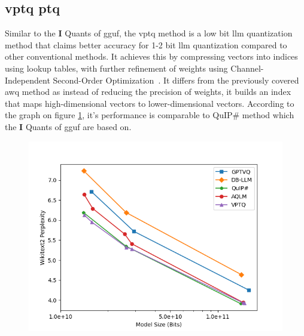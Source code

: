 \documentclass{ifacconf}
\begin{document}
	\subsection{\gls{vptq} \gls{ptq}}
	
	Similar to the \textbf{I} Quants of \gls{gguf}, the \gls{vptq} method is a low bit \gls{llm} quantization method that claims better accuracy for 1-2 bit \gls{llm} quantization compared to other conventional methods. It achieves this by compressing vectors into indices using lookup tables, with further refinement of weights using Channel-Independent Second-Order Optimization~\cite{liu2024vptqextremelowbitvector}. It differs from the previously covered \gls{awq} method as instead of reducing the precision of weights, it builds an index that maps high-dimensional vectors to lower-dimensional vectors. According to the graph on figure \ref{fig:vptq}, it's performance is comparable to QuIP\# method which the \textbf{I} Quants of \gls{gguf} are based on.
	
	\begin{figure}[h]
		\includegraphics[width=1.1\linewidth]{vptq}
		\label{fig:vptq}
	\end{figure}
	
\end{document}
